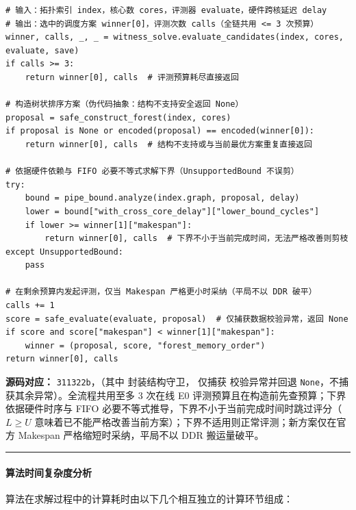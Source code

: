 \documentclass[anonymous,withtoc]{gmcm2026}
\begin{document}
\begin{lstlisting}[style=paperpseudo]
# 输入：拓扑索引 index，核心数 cores，评测器 evaluate，硬件跨核延迟 delay
# 输出：选中的调度方案 winner[0]，评测次数 calls（全链共用 <= 3 次预算）
winner, calls, _, _ = witness_solve.evaluate_candidates(index, cores, evaluate, save)
if calls >= 3:
    return winner[0], calls  # 评测预算耗尽直接返回

# 构造树状排序方案（伪代码抽象：结构不支持安全返回 None）
proposal = safe_construct_forest(index, cores)
if proposal is None or encoded(proposal) == encoded(winner[0]):
    return winner[0], calls  # 结构不支持或与当前最优方案重复直接返回

# 依据硬件依赖与 FIFO 必要不等式求解下界（UnsupportedBound 不误剪）
try:
    bound = pipe_bound.analyze(index.graph, proposal, delay)
    lower = bound["with_cross_core_delay"]["lower_bound_cycles"]
    if lower >= winner[1]["makespan"]:
        return winner[0], calls  # 下界不小于当前完成时间，无法严格改善则剪枝
except UnsupportedBound:
    pass

# 在剩余预算内发起评测，仅当 Makespan 严格更小时采纳（平局不以 DDR 破平）
calls += 1
score = safe_evaluate(evaluate, proposal)  # 仅捕获数据校验异常，返回 None
if score and score["makespan"] < winner[1]["makespan"]:
    winner = (proposal, score, "forest_memory_order")
return winner[0], calls
\end{lstlisting}
\textbf{源码对应：} \texttt{311322b}，\texttt{}（其中 \texttt{} 封装结构守卫，\texttt{} 仅捕获 \texttt{} 校验异常并回退 \texttt{None}，不捕获其余异常）。全流程共用至多 3 次在线 E0 评测预算且在构造前先查预算；下界依据硬件时序与 FIFO 必要不等式推导，下界不小于当前完成时间时跳过评分（\(L \ge U\) 意味着已不能严格改善当前方案）；下界不适用则正常评测；新方案仅在官方 Makespan 严格缩短时采纳，平局不以 DDR 搬运量破平。

\par\hrule\endgroup

\paragraph{算法时间复杂度分析}

算法在求解过程中的计算耗时由以下几个相互独立的计算环节组成：
\end{document}
